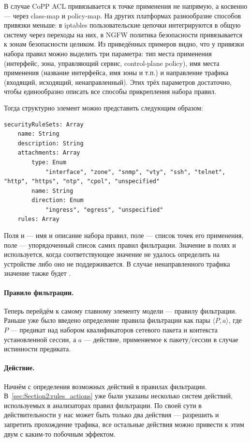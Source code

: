В случае CoPP ACL привязывается к точке применения  не напрямую, а косвенно --- через class-map и policy-map. На других платформах разнообразие способов привязки меньше: в iptables пользовательские цепочки интегрируются в общую систему через переходы на них, в NGFW политика безопасности привязывается к зонам безопасности целиком. Из приведённых примеров видно, что у привязки набора правил можно выделить три параметра: тип места применения (интерфейс, зона, управляющий сервис, control-plane policy), имя места применения (название интерфейса, имя зоны и т.п.) и направление трафика (входящий, исходящий, ненаправленный). Этих трёх параметров достаточно, чтобы единообразно описать все способы прикрепления набора правил.

Тогда структурно элемент  можно представить следующим образом:

\begin{lstlisting}[style=schemastyle]
securityRuleSets: Array
    name: String
    description: String
    attachments: Array
        type: Enum
            "interface", "zone", "snmp", "vty", "ssh", "telnet", "http", "https", "ntp", "cpol", "unspecified"
        name: String
        direction: Enum
            "ingress", "egress", "unspecified"
    rules: Array
\end{lstlisting}

Поля  и  --- имя и описание набора правил, поле  --- список точек его применения, поле  --- упорядоченный список самих правил фильтрации. Значение  в полях  и  используется, когда соответствующее значение не удалось определить на устройстве либо оно не поддерживается. В случае ненаправленного трафика значение  также будет .

\paragraph{Правило фильтрации.} Теперь перейдём к самому главному элементу модели --- правилу фильтрации. Раньше уже было введено определение правила фильтрации как пары $\langle P, a\rangle$, где $P$ --- предикат над набором квалификаторов сетевого пакета и контекста установленной сессии, а $a$ --- действие, применяемое к пакету/сессии в случае истинности предиката.

\paragraph{Действие.} Начнём с определения возможных действий в правилах фильтрации. В~\ref{sec:Section2:rules_actions} уже были указаны несколько систем действий, используемых в анализаторах правил фильтрации. По своей сути в действительности у нас может быть только два действия --- разрешить и запретить прохождение трафика, все остальные действия можно привести к этим двум с каким-то побочным эффектом.

